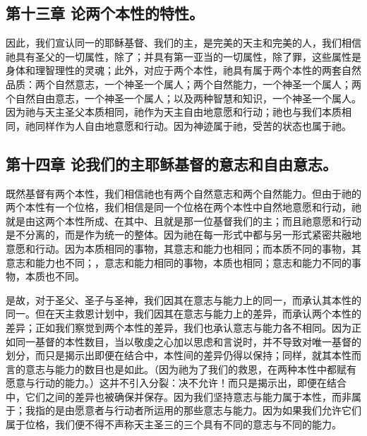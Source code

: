 
\subsection{第十三章 论两个本性的特性。}

因此，我们宣认同一的耶稣基督、我们的主，是完美的天主和完美的人，我们相信祂具有圣父的一切属性，除了；并具有第一亚当的一切属性，除了罪，这些属性是身体和理智理性的灵魂；此外，对应于两个本性，祂具有属于两个本性的两套自然品质：两个自然意志，一个神圣一个属人；两个自然能力，一个神圣一个属人；两个自然自由意志，一个神圣一个属人；以及两种智慧和知识，一个神圣一个属人。因为祂与天主圣父本质相同，祂作为天主自由地意愿和行动；祂也与我们本质相同，祂同样作为人自由地意愿和行动。因为神迹属于祂，受苦的状态也属于祂。\par


\subsection{第十四章 论我们的主耶稣基督的意志和自由意志。}

既然基督有两个本性，我们相信祂也有两个自然意志和两个自然能力。但由于祂的两个本性有一个位格，我们相信是同一个位格在两个本性中自然地意愿和行动，祂就是由这两个本性所成、在其中、且就是那一位基督我们的主；而且祂意愿和行动是不分离的，而是作为统一的整体。因为祂在每一形式中都与另一形式紧密共融地意愿和行动。因为本质相同的事物，其意志和能力也相同；而本质不同的事物，其意志和能力也不同；，意志和能力相同的事物，本质也相同；意志和能力不同的事物，本质也不同。\par

是故，对于圣父、圣子与圣神，我们因其在意志与能力上的同一，而承认其本性的同一。但在天主救恩计划中，我们因其在意志与能力上的差异，而承认两个本性的差异；正如我们察觉到两个本性的差异，我们也承认意志与能力各不相同。因为正如同一基督的本性数目，当以敬虔之心加以思虑和言说时，并不导致对唯一基督的划分，而只是揭示出即便在结合中，本性间的差异仍得以保持；同样，就其本性而言的意志与能力的数目也是如此。（因为祂为了我们的救恩，在两种本性中都赋有愿意与行动的能力。）这并不引入分裂：决不允许！而只是揭示出，即便在结合中，它们之间的差异也被确保并保存。因为我们坚持意志与能力属于本性，而非属于；我指的是由愿意者与行动者所运用的那些意志与能力。因为如果我们允许它们属于位格，我们便不得不声称天主圣三的三个具有不同的意志与不同的能力。\par

